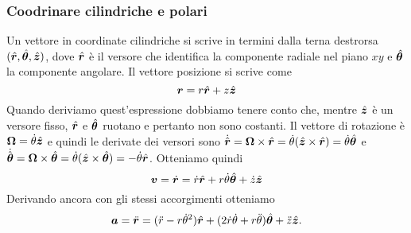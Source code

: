 \subsubsection{Coodrinare cilindriche e polari}
Un vettore in coordinate cilindriche si scrive in termini dalla terna destrorsa $ (\hat{\boldsymbol{r}}, \hat{\boldsymbol{\theta}}, \hat{\boldsymbol{z}}) $, dove $ \hat{\boldsymbol{r}} $ è il versore che identifica la componente radiale nel piano $ xy $ e $ \hat{\boldsymbol{\theta}} $ la componente angolare. Il vettore posizione si scrive come
\begin{equation}
\boldsymbol{r} = r \hat{\boldsymbol{r}} + z \hat{\boldsymbol{z}}
\end{equation}
Quando deriviamo quest'espressione dobbiamo tenere conto che, mentre $ \hat{\boldsymbol{z}} $ è un versore fisso, $ \hat{\boldsymbol{r}} $ e $ \hat{\boldsymbol{\theta}} $ ruotano e pertanto non sono costanti. Il vettore di rotazione è $ \boldsymbol{\Omega} = \dot{\theta} \hat{\boldsymbol{z}} $ e quindi le derivate dei versori sono $ \dot{\hat{\boldsymbol{r}}} = \boldsymbol{\Omega} \times \hat{\boldsymbol{r}} = \dot{\theta} (\hat{\boldsymbol{z}} \times \hat{\boldsymbol{r}}) = \dot \theta \hat{\boldsymbol{\theta}} $ e $ \dot{\hat{\boldsymbol{\theta}}} = \boldsymbol{\Omega} \times \hat{\boldsymbol{\theta}} = \dot \theta (\hat{\boldsymbol{z}} \times \hat{\boldsymbol{\theta}}) = - \dot \theta \hat{\boldsymbol{r}} $. Otteniamo quindi
\begin{equation}
\boldsymbol{v} = \dot{\boldsymbol{r}} = \dot r \hat{\boldsymbol{r}} + r \dot \theta \hat{\boldsymbol{\theta}} + \dot z \hat{\boldsymbol{z}}
\end{equation}
Derivando ancora con gli stessi accorgimenti otteniamo
\begin{equation}
\boldsymbol{a} = \ddot{\boldsymbol{r}} = (\ddot r - r \dot \theta^2) \hat{\boldsymbol{r}} + (2 \dot r \dot \theta + r \ddot \theta) \hat{\boldsymbol{\theta}} + \ddot z \hat{\boldsymbol{z}}.
\end{equation}

